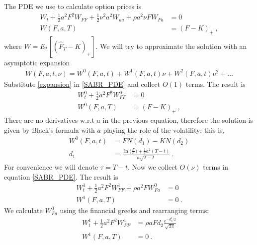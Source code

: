 \documentclass[10pt]{article}
\numberwithin{equation}{section}
\begin{document}
The PDE we use to calculate option prices is
\begin{equation}\label{SABR_PDE}
	\begin{split}
	W_t + \frac{1}{2} a^2 F^2 W_{FF}+ \frac{1}{2} \nu^2 a^2 W_{aa}  + \rho a^2 \nu F W_{Fa}&=0\\
	W(F,a,T)&=(F-K)_{+}\:,
	\end{split}
\end{equation}
where $W=E_{*}[(\widehat{F}_{T}-K)_{+}]$. We will try to approximate the solution with an asymptotic expansion
\begin{equation}\label{expansion}
	\begin{split}
	W(F,a,t,\nu) = W^{0}(F,a,t) + W^{1}(F,a,t) \nu + W^{2}(F,a,t) \nu^2 +\ldots
	\end{split}
\end{equation}
Substitute \eqref{expansion} in \eqref{SABR_PDE} and collect $O(1)$ terms. The result is
\begin{equation}\label{order_0}
	\begin{split}
	W_t^{0} + \frac{1}{2}  a^2 F^2 W_{FF}^{0}&=0\\
	W^{0}(F,a,T)&=(F-K)_{+}\:,
	\end{split}
\end{equation}
There are no derivatives w.r.t $a$ in the previous equation, therefore the solution is given by Black's formula with $a$ playing the role of the volatility; this is,
\begin{equation*}
	\begin{split}
	W^{0}(F,a,t)&= FN(d_1)-KN(d_2)\\
	d_{1}&=\frac{\ln\bigl( \frac{F}{K}\bigr)+\frac{1}{2} a^2 (T-t)}{a\sqrt{T-t}}\:.
	\end{split}
\end{equation*}
For convenience we will denote $\tau = T -t$. Now we collect $O(\nu)$ terms in equation \eqref{SABR_PDE}. The result is
\begin{equation}
	\begin{split}
	W_t^{1} + \frac{1}{2}  a^2 F^2 W_{FF}^{1}+\rho a^2 F W_{Fa}^{0}&=0\\
	W^{1}(F,a,T)&=0\:.
	\end{split}
\end{equation}
We calculate $W_{Fa}^{0}$ using the financial greeks and rearranging terms:
\begin{equation}\label{order_1}
	\begin{split}
	W_t^{1} + \frac{1}{2}  a^2 F^2 W_{FF}^{1} &=\rho a  F d_2 \frac{e^{-d_1^2 / 2}}{\sqrt{2\pi}}\\
	W^{1}(F,a,T)&=0\:.
	\end{split}
\end{equation}
\end{document}
